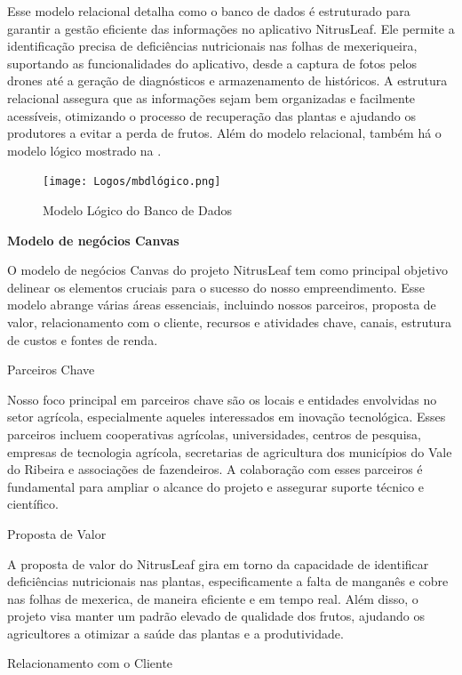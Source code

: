 \documentclass[
  a4paper,%
  12pt,%
  english,%
  brazilian,%
]{article}
\begin{document}
Esse modelo relacional detalha como o banco de dados é estruturado para garantir a gestão eficiente das informações no aplicativo NitrusLeaf. Ele permite a identificação precisa de deficiências nutricionais nas folhas de mexeriqueira, suportando as funcionalidades do aplicativo, desde a captura de fotos pelos drones até a geração de diagnósticos e armazenamento de históricos. A estrutura relacional assegura que as informações sejam bem organizadas e facilmente acessíveis, otimizando o processo de recuperação das plantas e ajudando os produtores a evitar a perda de frutos. Além do modelo relacional, também há o modelo lógico mostrado na .

\begin{figure}[H]
\centering
\caption{Modelo Lógico do Banco de Dados}%
\label{fig:mbdlogico}
\texttt{[image: Logos/mbdlógico.png]}
\end{figure}

\textbf{Modelo de negócios Canvas}

O modelo de negócios Canvas do projeto NitrusLeaf  tem como principal objetivo delinear os elementos cruciais para o sucesso do nosso empreendimento. Esse modelo abrange várias áreas essenciais, incluindo nossos parceiros, proposta de valor, relacionamento com o cliente, recursos e atividades chave, canais, estrutura de custos e fontes de renda.

Parceiros Chave

Nosso foco principal em parceiros chave são os locais e entidades envolvidas no setor agrícola, especialmente aqueles interessados em inovação tecnológica. Esses parceiros incluem cooperativas agrícolas, universidades, centros de pesquisa, empresas de tecnologia agrícola, secretarias de agricultura dos municípios do Vale do Ribeira e associações de fazendeiros. A colaboração com esses parceiros é fundamental para ampliar o alcance do projeto e assegurar suporte técnico e científico.

Proposta de Valor

A proposta de valor do NitrusLeaf gira em torno da capacidade de identificar deficiências nutricionais nas plantas, especificamente a falta de manganês e cobre nas folhas de mexerica, de maneira eficiente e em tempo real. Além disso, o projeto visa manter um padrão elevado de qualidade dos frutos, ajudando os agricultores a otimizar a saúde das plantas e a produtividade.

Relacionamento com o Cliente
\end{document}
